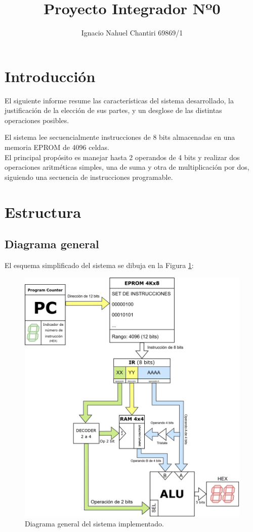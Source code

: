 \documentclass{sciposter}
\title{Proyecto Integrador Nº0
\\ }
\author{Ignacio Nahuel Chantiri 69869/1}
\institute 
{Facultad de Ingeniería de la Universidad Nacional de La Plata}
\begin{document}



\maketitle

\begin{multicols*}{2}

\section{Introducción}
El siguiente informe resume las características del sistema desarrollado, la justificación de la elección de sus partes, y un desglose de las distintas operaciones posibles. 

El sistema lee secuencialmente instrucciones de 8 bits almacenadas en una memoria EPROM de 4096 celdas.\\
El principal propósito es manejar hasta 2 operandos de 4 bits y realizar dos operaciones aritméticas simples, una de suma y otra de multiplicación por dos, siguiendo una secuencia de instrucciones programable.

\section{Estructura}
\subsection{Diagrama general}
El esquema simplificado del sistema se dibuja en la Figura \ref{fig:diagramageneral}:

\begin{figure}[H]
    \centering
    \includegraphics[width=0.7\linewidth]{Esquema general.png}
    \caption{Diagrama general del sistema implementado.}
    \label{fig:diagramageneral}
\end{figure}


\end{multicols*}
\end{document}
